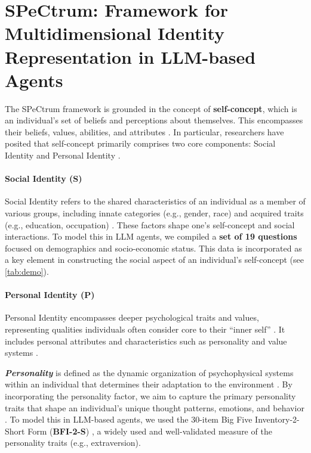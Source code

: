\section{SPeCtrum: Framework for Multidimensional Identity Representation in LLM-based Agents}

The SPeCtrum framework is grounded in the concept of \textbf{self-concept}, which is an individual's set of beliefs and perceptions about themselves. This encompasses their beliefs, values, abilities, and attributes \citep{bracken1996handbook,markus1987dynamic,oyserman_self-concept_2001}. In particular, researchers have posited that self-concept primarily comprises two core components: Social Identity and Personal Identity \citep{Jones2000ACM, nario-redmond_social_2004}.

\paragraph{Social Identity (S)}
Social Identity refers to the shared characteristics of an individual as a member of various groups, including innate categories (e.g., gender, race) and acquired traits (e.g., education, occupation) \cite{oyserman_self-concept_2001}. These factors shape one’s self-concept and social interactions. To model this in LLM agents, we compiled a \textbf{set of 19 questions} focused on demographics and socio-economic status. This data is incorporated as a key element in constructing the social aspect of an individual's self-concept (see \ref{tab:demo}).

\paragraph{Personal Identity (P)}
Personal Identity encompasses deeper psychological traits and values, representing qualities individuals often consider core to their ``inner self'' \citep{Jones2000ACM, fearon1999identity}. It includes personal attributes and characteristics such as personality and value systems \citep{fearon1999identity}.

\textbf{\textit{Personality}} is defined as the dynamic organization of psychophysical systems within an individual that determines their adaptation to the environment \citep{allport1937personality}. By incorporating the personality factor, we aim to capture the primary personality traits that shape an individual's unique thought patterns, emotions, and behavior \citep{corr&matthews2009, weinberg_foundations_2019}. To model this in LLM-based agents, we used the 30-item Big Five Inventory-2-Short Form (\textbf{BFI-2-S}) \citep{bfi_short_2017}, a widely used and well-validated measure of the personality traits (e.g., extraversion).

